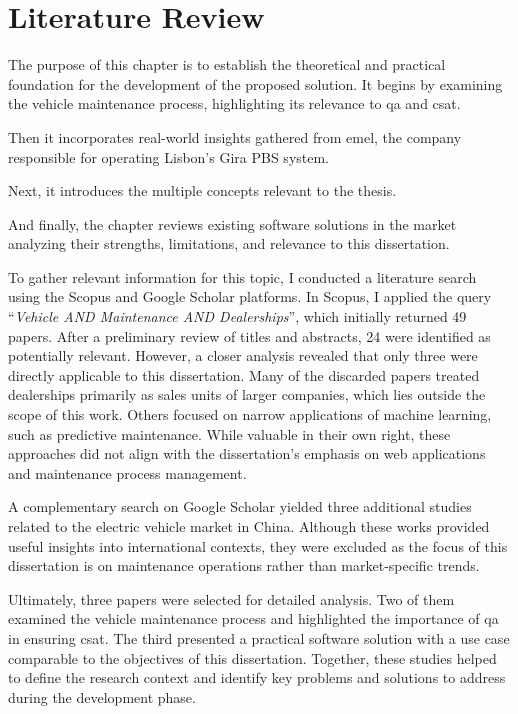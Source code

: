 \chapter{Literature Review}%
\label{chapter:literatureReview}

\begin{introduction}
The purpose of this chapter is to establish the theoretical and practical foundation for the development of the proposed solution. It begins by examining the vehicle maintenance process, highlighting its relevance to \acs{qa} and \acs{csat}. 

Then it incorporates real-world insights gathered from \acs{emel}, the company responsible for operating Lisbon's Gira \acs{PBS} system. 

Next, it introduces the multiple concepts relevant to the thesis.

And finally, the chapter reviews existing software solutions in the market analyzing their strengths, limitations, and relevance to this dissertation.
\end{introduction} 

To gather relevant information for this topic, I conducted a literature search using the Scopus and Google Scholar platforms. In Scopus, I applied the query “\textit{Vehicle AND Maintenance AND Dealerships}”, which initially returned 49 papers. After a preliminary review of titles and abstracts, 24 were identified as potentially relevant. However, a closer analysis revealed that only three were directly applicable to this dissertation. Many of the discarded papers treated dealerships primarily as sales units of larger companies, which lies outside the scope of this work. Others focused on narrow applications of machine learning, such as predictive maintenance. While valuable in their own right, these approaches did not align with the dissertation's emphasis on web applications and maintenance process management.

A complementary search on Google Scholar yielded three additional studies related to the electric vehicle market in China. Although these works provided useful insights into international contexts, they were excluded as the focus of this dissertation is on maintenance operations rather than market-specific trends.

Ultimately, three papers were selected for detailed analysis. Two of them examined the vehicle maintenance process and highlighted the importance of \acs{qa} in ensuring \acs{csat}. The third presented a practical software solution with a use case comparable to the objectives of this dissertation. Together, these studies helped to define the research context and identify key problems and solutions to address during the development phase.


